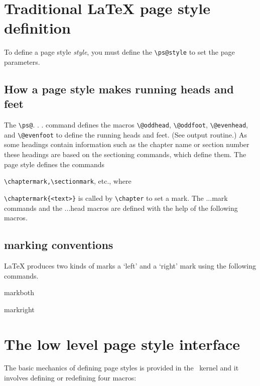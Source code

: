 \section{Traditional LaTeX page style definition}
To define a page style \textit{style}, you must define the \lstinline{\ps@style} to set the page parameters.

\subsection{How a page style makes running heads and feet}
The \lstinline{\ps@}. . . command defines the macros \lstinline{\@oddhead}, \lstinline{\@oddfoot}, \lstinline{\@evenhead},
and \lstinline{\@evenfoot} to define the running heads and feet. (See output routine.) As some headings contain information such as the chapter name or section number these
headings are based on the sectioning commands, which define them. The page style defines the commands




\verb!\chaptermark,\sectionmark!, etc., where

\verb+\chaptermark{<text>}+ is called by \verb+\chapter+ to set a mark. The  ...mark commands and the ...head
macros are defined with the help of the following macros.



\subsection{marking conventions}

LaTeX produces two kinds of marks a `left' and a `right' mark using the following commands.

markboth

markright



\section{The low level page style interface}
The basic mechanics of defining page styles is provided in the \LaTeXe\ kernel and it  involves defining or redefining four macros:


